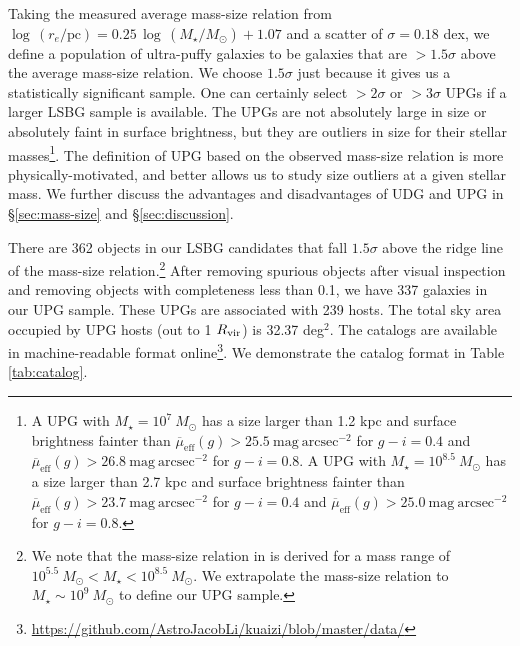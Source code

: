 \documentclass[twocolumn,astrosymb,twocolappendix]{aastex631}
\newcommand{\sbunit}{\mathrm{mag\ arcsec}^{-2}}
\newcommand{\sbeff}{\overline{\mu}_{\mathrm{eff}}(g)}
\begin{document}
\begin{CJK*}{UTF8}{gbsn}
Taking the measured average mass-size relation from \citet{ELVES-I} $\log\, (r_e/\mathrm{pc}) = 0.25\, \log\, (M_\star/M_\odot) + 1.07$ and a scatter of $\sigma=0.18$ dex, we define a population of ultra-puffy galaxies to be galaxies that are $>1.5\sigma$ above the average mass-size relation. We choose $1.5\sigma$ just because it gives us a statistically significant sample. One can certainly select $>2\sigma$ or $>3\sigma$ UPGs if a larger LSBG sample is available. The UPGs are not absolutely large in size or absolutely faint in surface brightness, but they are outliers in size for their stellar masses\footnote{A UPG with $M_\star = 10^7\ M_\odot$ has a size larger than 1.2 kpc and surface brightness fainter than $\sbeff > 25.5\ \sbunit$ for $g-i=0.4$ and $\sbeff > 26.8\ \sbunit$ for $g-i=0.8$. A UPG with $M_\star = 10^{8.5}\ M_\odot$ has a size larger than 2.7 kpc and surface brightness fainter than $\sbeff > 23.7\ \sbunit$ for $g-i=0.4$ and $\sbeff > 25.0\ \sbunit$ for $g-i=0.8$.}. The definition of UPG based on the observed mass-size relation is more physically-motivated, and better allows us to study size outliers at a given stellar mass. We further discuss the advantages and disadvantages of UDG and UPG in \S\ref{sec:mass-size} and \S\ref{sec:discussion}.

There are 362 objects in our LSBG candidates that fall $1.5\sigma$ above the ridge line of the mass-size relation.\footnote{We note that the mass-size relation in \citet{ELVES-I} is derived for a mass range of $10^{5.5}\ M_\odot < M_\star < 10^{8.5}\ M_\odot$. We extrapolate the mass-size relation to $M_\star \sim 10^9\ M_\odot$ to define our UPG sample.} After removing spurious objects after visual inspection and removing objects with completeness less than 0.1, we have 337 galaxies in our UPG sample. These UPGs are associated with 239 hosts. The total sky area occupied by UPG hosts (out to 1 $R_{\rm{vir}}$) is 32.37 deg$^{2}$. The catalogs are available in machine-readable format online\footnote{\url{https://github.com/AstroJacobLi/kuaizi/blob/master/data/}}. We demonstrate the catalog format in Table \ref{tab:catalog}. 


\end{CJK*}
\end{document}
